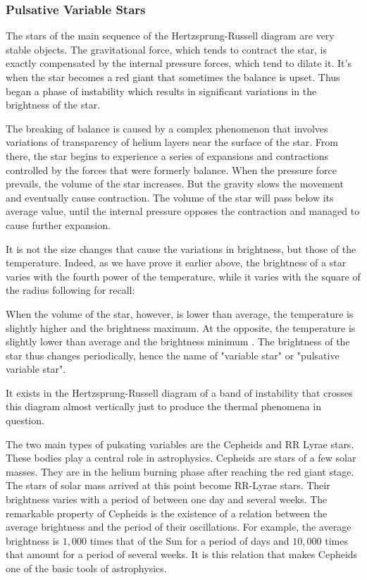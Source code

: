 	\subsubsection{Pulsative Variable Stars}
	The stars of the main sequence of the Hertzsprung-Russell diagram are very stable objects. The gravitational force, which tends to contract the star, is exactly compensated by the internal pressure forces, which tend to dilate it. It's when the star becomes a red giant that sometimes the balance is upset. Thus began a phase of instability which results in significant variations in the brightness of the star.

	The breaking of balance is caused by a complex phenomenon that involves variations of transparency of helium layers near the surface of the star. From there, the star begins to experience a series of expansions and contractions controlled by the forces that were formerly balance. When the pressure force prevails, the volume of the star increases. But the gravity slows the movement and eventually cause contraction. The volume of the star will pass below its average value, until the internal pressure opposes the contraction and managed to cause further expansion.

	It is not the size changes that cause the variations in brightness, but those of the temperature. Indeed, as we have prove it earlier above, the brightness of a star varies with the fourth power of the temperature, while it varies with the square of the radius following for recall:
	
	When the volume of the star, however, is lower than average, the temperature is slightly higher and the brightness maximum. At the opposite, the temperature is slightly lower than average and the brightness minimum . The brightness of the star thus changes periodically, hence the name of "variable star" or "pulsative variable star".

	It exists in the Hertzsprung-Russell diagram of a band of instability that crosses this diagram almost vertically just to produce the thermal phenomena in question.

	The two main types of pulsating variables are the Cepheids and RR Lyrae stars. These bodies play a central role in astrophysics. Cepheids are stars of a few solar masses. They are in the helium burning phase after reaching the red giant stage. The stars of solar mass arrived at this point become RR-Lyrae stars. Their brightness varies with a period of between one day and several weeks. The remarkable property of Cepheids is the existence of a relation between the average brightness and the period of their oscillations. For example, the average brightness is $1,000$ times that of the Sun for a period of days and $10,000$ times that amount for a period of several weeks. It is this relation that makes Cepheids one of the basic tools of astrophysics.
	
